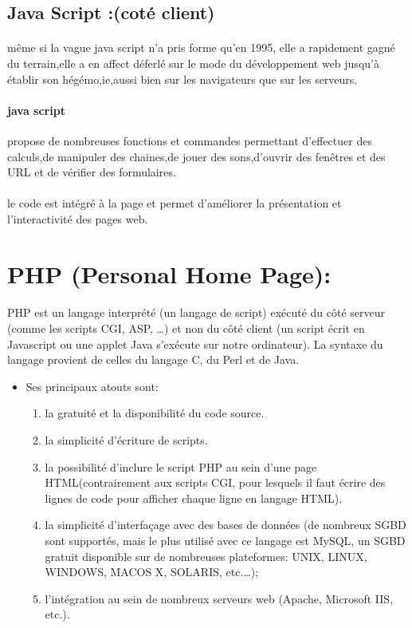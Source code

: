 \subsection{Java Script :(coté client)}
\paragraph{}
même si la vague java script n'a pris forme qu'en 1995, elle a rapidement gagné du terrain,elle a en affect déferlé sur le mode du développement web jusqu'à établir son hégémo,ie,aussi bien sur les navigateurs que sur les serveurs.
\paragraph{java script}
propose de nombreuses fonctions et commandes permettant d'effectuer des calculs,de manipuler des chaines,de jouer des sons,d'ouvrir des fenêtres et des URL et de vérifier des formulaires.
\paragraph{}
le code est intégré à la page et permet d'améliorer la présentation et l'interactivité des pages web.
\section{PHP (Personal Home Page):}
\paragraph{}
PHP est un langage interprété (un langage de script) exécuté du côté
serveur (comme les scripts CGI, ASP, …) et non du côté client (un script
écrit en Javascript ou une applet Java s'exécute sur notre ordinateur). La
syntaxe du langage provient de celles du langage C, du Perl et de Java.
\begin{itemize}
	\item Ses principaux atouts sont:
	\subitem
	\begin{enumerate}
		\item la gratuité et la disponibilité du code source.
		\item la simplicité d'écriture de scripts.
		\item la possibilité d'inclure le script PHP au sein d'une page HTML(contrairement aux scripts CGI, pour lesquels il faut écrire des lignes de code pour afficher chaque ligne en langage HTML).
		\item la simplicité d'interfaçage avec des bases de données (de
		nombreux SGBD sont supportés, mais le plus utilisé avec ce langage est MySQL, un SGBD gratuit disponible sur de
		nombreuses plateformes: UNIX, LINUX, WINDOWS, MACOS X,
		SOLARIS, etc.…);
		\item l'intégration au sein de nombreux serveurs web (Apache,
		Microsoft IIS, etc.).
	\end{enumerate}

\end{itemize}
